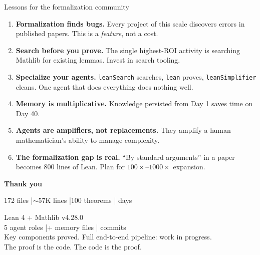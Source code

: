 \documentclass[aspectratio=169,10pt]{beamer}
\begin{document}
\begin{frame}{Lessons for the formalization community}
    \vspace{-0.4em}
    \begin{enumerate}
        \item \textcolor{leangreen}{\textbf{Formalization finds bugs.}} Every project of this scale discovers errors in published papers. This is a \emph{feature}, not a cost.
        \item \textcolor{leangreen}{\textbf{Search before you prove.}} The single highest-ROI activity is searching Mathlib for existing lemmas. Invest in search tooling.
        \item \textcolor{leangreen}{\textbf{Specialize your agents.}} \texttt{leanSearch} searches, \texttt{lean} proves, \texttt{leanSimplifier} cleans. One agent that does everything does nothing well.
        \item \textcolor{leangreen}{\textbf{Memory is multiplicative.}} Knowledge persisted from Day 1 saves time on Day 40.
        \item \textcolor{amber}{\textbf{Agents are amplifiers, not replacements.}} They amplify a human mathematician's ability to manage complexity.
        \item \textcolor{amber}{\textbf{The formalization gap is real.}} ``By standard arguments'' in a paper becomes 800 lines of Lean. Plan for $100\times$--$1000\times$ expansion.
    \end{enumerate}
\end{frame}

\begin{frame}{}
    \vspace{2cm}
    \begin{center}
        {\Huge\textcolor{leangreen}{\textbf{Thank you}}}
        \vspace{1.5em}

        {\large\textcolor{dimwhite}{172 files \quad|\quad $\sim$57K lines \quad|100 theorems \quad| days}}
        \vspace{1em}

        {\footnotesize\textcolor{dimwhite}{Lean 4 + Mathlib v4.28.0\\
          5 agent roles \quad|+ memory files \quad| commits\\[4pt]
          \textcolor{amber}{Key components proved. Full end-to-end pipeline: work in progress.}\\[2pt]
          \textcolor{leangreen}{The proof is the code. The code is the proof.}}}
    \end{center}
\end{frame}
\end{document}
